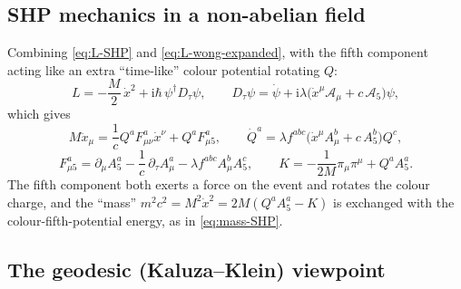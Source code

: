 \documentclass[11pt,a4paper]{book}
\numberwithin{equation}{section}
\newcommand{\ii}{\mathrm{i}}
\theoremstyle{definition}
\theoremstyle{remark}
\begin{document}
\subsection{SHP mechanics in a non-abelian field}

Combining \eqref{eq:L-SHP} and \eqref{eq:L-wong-expanded}, with the fifth
component acting like an extra ``time-like'' colour potential rotating $Q$:
\begin{equation}
  L=-\frac M2\,\dot x^2+\ii\hbar\,\psi^\dagger D_\tau\psi,\qquad
  D_\tau\psi=\dot\psi+\ii\lambda\bigl(\dot x^\mu\mathcal A_\mu+c\,\mathcal A_5\bigr)\psi,
\end{equation}
which gives
\begin{equation}
  M\ddot x_\mu=\frac1cQ^aF^a_{\mu\nu}\dot x^\nu+Q^aF^a_{\mu5},\qquad
  \dot Q^a=\lambda f^{abc}\bigl(\dot x^\mu A^b_\mu+c\,A^b_5\bigr)Q^c,
\end{equation}
\begin{equation}
  F^a_{\mu5}=\partial_\mu A^a_5-\frac1c\,\partial_\tau A^a_\mu-\lambda f^{abc}A^b_\mu A^c_5,\qquad
  K=-\frac1{2M}\pi_\mu\pi^\mu+Q^aA^a_5 .
\end{equation}
The fifth component both exerts a force on the event and rotates the colour
charge, and the ``mass'' $m^2c^2=M^2\dot x^2=2M(Q^aA^a_5-K)$ is exchanged
with the colour-fifth-potential energy, as in \eqref{eq:mass-SHP}.

\subsection{The geodesic (Kaluza--Klein) viewpoint}\label{sec:KK}
\end{document}
